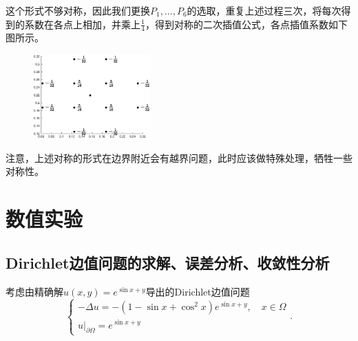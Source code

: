 \documentclass[lang=cn,10pt]{elegantbook}
\begin{document}
这个形式不够对称，因此我们更换$P_1,...,P_6$的选取，重复上述过程三次，将每次得到的系数在各点上相加，并乘上$\frac{1}{4}$，得到对称的二次插值公式，各点插值系数如下图所示。
\begin{figure}[H]
  \centering
  \includegraphics[width=0.4\textwidth]{figure/2-1.eps}
\end{figure}

注意，上述对称的形式在边界附近会有越界问题，此时应该做特殊处理，牺牲一些对称性。

\section{数值实验}

\subsection{Dirichlet边值问题的求解、误差分析、收敛性分析}

考虑由精确解$u(x,y)=e^{\sin x+y}$导出的Dirichlet边值问题
\begin{equation}
  \left\{
    \begin{array}{l}
      -\Delta u = -(1-\sin x+\cos^2 x)e^{\sin x + y},\quad x\in\Omega \\
      u|_{\partial \Omega}=e^{\sin x + y}
    \end{array}
  \right. .
\end{equation}
\end{document}
